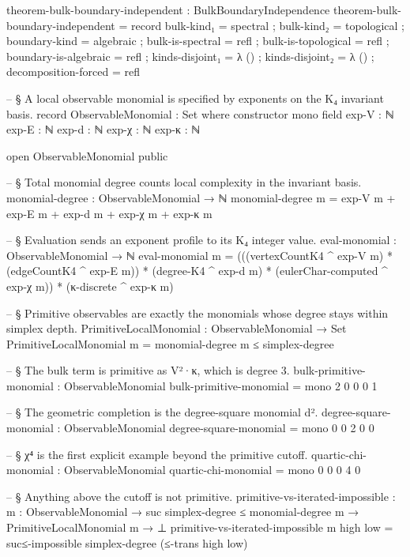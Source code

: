 \documentclass[11pt,a4paper]{book}
\begin{document}
\begin{code}
theorem-bulk-boundary-independent : BulkBoundaryIndependence
theorem-bulk-boundary-independent = record
  { bulk-kind₁            = spectral
  ; bulk-kind₂            = topological
  ; boundary-kind         = algebraic
  ; bulk-is-spectral      = refl
  ; bulk-is-topological   = refl
  ; boundary-is-algebraic = refl
  ; kinds-disjoint₁       = λ ()
  ; kinds-disjoint₂       = λ ()
  ; decomposition-forced  = refl
  }


-- § A local observable monomial is specified by exponents on the K₄ invariant basis.
record ObservableMonomial : Set where
  constructor mono
  field
    exp-V : ℕ
    exp-E : ℕ
    exp-d : ℕ
    exp-χ : ℕ
    exp-κ : ℕ

open ObservableMonomial public

-- § Total monomial degree counts local complexity in the invariant basis.
monomial-degree : ObservableMonomial → ℕ
monomial-degree m =
  exp-V m + exp-E m + exp-d m + exp-χ m + exp-κ m

-- § Evaluation sends an exponent profile to its K₄ integer value.
eval-monomial : ObservableMonomial → ℕ
eval-monomial m =
  (((vertexCountK4 ^ exp-V m)
    * (edgeCountK4 ^ exp-E m))
    * (degree-K4 ^ exp-d m)
    * (eulerChar-computed ^ exp-χ m))
    * (κ-discrete ^ exp-κ m)

-- § Primitive observables are exactly the monomials whose degree stays within simplex depth.
PrimitiveLocalMonomial : ObservableMonomial → Set
PrimitiveLocalMonomial m = monomial-degree m ≤ simplex-degree

-- § The bulk term is primitive as V²·κ, which is degree 3.
bulk-primitive-monomial : ObservableMonomial
bulk-primitive-monomial = mono 2 0 0 0 1

-- § The geometric completion is the degree-square monomial d².
degree-square-monomial : ObservableMonomial
degree-square-monomial = mono 0 0 2 0 0

-- § χ⁴ is the first explicit example beyond the primitive cutoff.
quartic-chi-monomial : ObservableMonomial
quartic-chi-monomial = mono 0 0 0 4 0

-- § Anything above the cutoff is not primitive.
primitive-vs-iterated-impossible :
  {m : ObservableMonomial} →
  suc simplex-degree ≤ monomial-degree m →
  PrimitiveLocalMonomial m →
  ⊥
primitive-vs-iterated-impossible {m} high low =
  suc≤-impossible simplex-degree (≤-trans high low)


\end{code}
\end{document}
